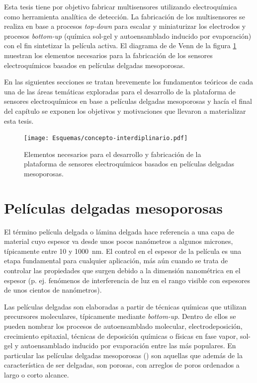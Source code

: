     	Esta tesis tiene por objetivo fabricar multisensores utilizando electroquímica como herramienta analítica de detección. La fabricación de los multisensores se realiza en base a procesos \textit{top-down} para escalar y miniaturizar los electrodos y procesos \textit{bottom-up} (química sol-gel y autoensamblado inducido por evaporación) con el fin sintetizar la película activa. El diagrama de  de Venn de la figura \ref{fig:sensores} muestran los elementos necesarios para la fabricación de los sensores electroquímicos basados en películas delgadas mesoporosas. 
	 	
 		En las siguientes secciones se tratan brevemente los fundamentos teóricos de cada una de las áreas temáticas exploradas para el desarrollo de la plataforma de sensores electroquímicos en base a películas delgadas mesoporosas y hacía el final del capítulo se exponen los objetivos y motivaciones que llevaron a materializar esta tesis.


	       \begin{figure}[ht!]
 				\begin{center}
 				\texttt{[image: Esquemas/concepto-interdiplinario.pdf]}
 				\caption[Plataforma de sensores. Diagrama de Venn.]{Elementos necesarios para el desarrollo y fabricación de la plataforma de sensores electroquímicos basados en películas delgadas mesoporosas.}
 		   		\label{fig:sensores}
 		    	\end{center}
 		    	\end{figure}

\section{Películas delgadas mesoporosas}\label{sec:mesoporosos}
	
	 El término película delgada o lámina delgada hace referencia a una capa de material cuyo espesor va desde unos pocos nanómetros a algunos micrones, típicamente entre 10 y \SI{1000}{\nm}. El control en el espesor de la película es una etapa fundamental para cualquier aplicación, más aún cuando se trata de controlar las propiedades que surgen debido a la dimensión nanométrica en el espesor (p. ej. fenómenos de interferencia de luz en el rango visible con espesores de unos cientos de nanómetros). 

     Las películas delgadas son elaboradas a partir de técnicas químicas que utilizan precursores moleculares, típicamente mediante \textit{bottom-up}. Dentro de ellos se pueden nombrar los procesos de autoensamblado molecular, electrodeposición, crecimiento epitaxial, técnicas de deposición químicas o físicas en fase vapor, sol-gel y autoensamblado inducido por evaporación entre las más populares. En particular las películas delgadas mesoporosas (\pdm) son aquellas que además de la característica de ser delgadas, son porosas, con arreglos de poros ordenados a largo o corto alcance.\cite{Brinker1990,Lu1997,Innocenzi2013}

